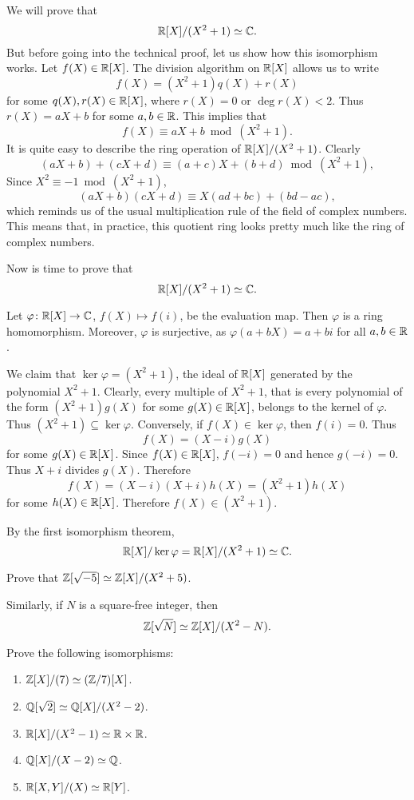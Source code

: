 \begin{example}
    We will prove that 
	\[
	\mathbb{R}[X]/(X^2+1)\simeq\mathbb{C}. 
	\]
    But before going into the technical proof, let us show how this
    isomorphism works. 
    Let $f(X)\in\mathbb{R}[X]$. 
	The division algorithm on $\mathbb{R}[X]$ allows us to write
	\[
	f(X)=(X^2+1)q(X)+r(X)
	\]
	for some $q(X),r(X)\in\mathbb{R}[X]$, where $r(X)=0$ or $\deg r(X)<2$. Thus
	$r(X)=aX+b$ for some $a,b\in\mathbb{R}$. This implies that
	\[
	f(X)\equiv aX+b\bmod (X^2+1).
	\] 
	It is quite easy to describe the ring operation of 
	$\mathbb{R}[X]/(X^2+1)$. Clearly 
	\[
	(aX+b)+(cX+d)\equiv (a+c)X+(b+d)\bmod (X^2+1),
	\]
	Since $X^2\equiv -1\bmod (X^2+1)$,   	
	\[
	(aX+b)(cX+d)\equiv X(ad+bc)+(bd-ac), 
	\]
	which reminds us of the usual 
	multiplication rule of the field of complex numbers. This means that, in practice, 
	this quotient ring looks pretty much like the ring of 
	complex numbers.

    Now is time to prove that
	\[
		\mathbb{R}[X]/(X^2+1)\simeq\mathbb{C}. 
	\] 

    Let $\varphi\colon \mathbb{R}[X]\to\mathbb{C}$, $f(X)\mapsto f(i)$, be the evaluation map. Then
    $\varphi$ is a ring homomorphism. Moreover, $\varphi$ is surjective, as
    $\varphi(a+bX)=a+bi$ for all $a,b\in\mathbb{R}$. 
	
	We claim that $\ker\varphi=(X^2+1)$, the ideal
	of $\mathbb{R}[X]$ generated by the polynomial $X^2+1$.  
    Clearly, every multiple of $X^2+1$, that is every polynomial
    of the form $(X^2+1)g(X)$ for some $g(X)\in\mathbb{R}[X]$, belongs to the kernel of $\varphi$. 
    Thus $(X^2+1)\subseteq\ker\varphi$. Conversely, if 
    $f(X)\in\ker\varphi$, then $f(i)=0$. Thus 
	\[
        f(X)=(X-i)g(X)
    \]
    for some $g(X)\in\mathbb{R}[X]$. Since $f(X)\in\mathbb{R}[X]$, 
    $f(-i)=0$ and hence $g(-i)=0$. Thus $X+i$ divides $g(X)$. Therefore 
    \[
        f(X)=(X-i)(X+i)h(X)=(X^2+1)h(X)
    \]
    for some $h(X)\in\mathbb{R}[X]$. Therefore $f(X)\in (X^2+1)$. 
	
	By the first 
    isomorphism theorem, 
    \[
	\mathbb{R}[X]/\ker\varphi=\mathbb{R}[X]/(X^2+1)\simeq\mathbb{C}.
	\] 
\end{example}

\begin{exercise}
	Prove that $\mathbb{Z}[\sqrt{-5}]\simeq\mathbb{Z}[X]/(X^2+5)$. 	
\end{exercise}

Similarly, if $N$ is a square-free integer, then 
\[
\mathbb{Z}[\sqrt{N}]\simeq\mathbb{Z}[X]/(X^2-N).
\]

\begin{exercise}
\label{xca:ring_isos}
Prove the following isomorphisms:
\begin{enumerate}
	\item $\mathbb{Z}[X]/(7)\simeq (\mathbb{Z}/7)[X]$.
	\item $\mathbb{Q}[\sqrt{2}]\simeq\mathbb{Q}[X]/(X^2-2)$.
	\item $\mathbb{R}[X]/(X^2-1)\simeq\mathbb{R}\times\mathbb{R}$.
	\item $\mathbb{Q}[X]/(X-2)\simeq\mathbb{Q}$.
	\item $\mathbb{R}[X,Y]/(X)\simeq\mathbb{R}[Y]$. 
\end{enumerate}
\end{exercise}

